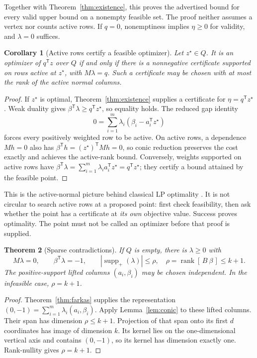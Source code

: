 \documentclass[11pt,letterpaper]{article}
\newcommand{\T}{\mathsf T}
\DeclareMathOperator{\rank}{rank}
\DeclareMathOperator{\supp}{supp}
\newtheorem{theorem}{Theorem}[section]
\newtheorem{corollary}[theorem]{Corollary}
\theoremstyle{definition}
\theoremstyle{remark}
\numberwithin{equation}{section}
\begin{document}
Together with Theorem~\ref{thm:existence}, this proves the advertised bound
for every valid upper bound on a nonempty feasible set. The proof neither
assumes a vertex nor counts active rows. If \(q=0\), nonemptiness implies
\(\eta\ge0\) for validity, and \(\lambda=0\) suffices.

\begin{corollary}[Active rows certify a feasible optimizer]\label{cor:active}
Let \(z^\star\in Q\). It is an optimizer of \(q^\T z\) over \(Q\) if and
only if there is a nonnegative certificate supported on rows active at
\(z^\star\), with \(M\lambda=q\).
Such a certificate may be chosen with at most the rank of the active
normal columns.
\end{corollary}
\begin{proof}
If \(z^\star\) is optimal, Theorem~\ref{thm:existence} supplies a certificate
for \(\eta=q^\T z^\star\). Weak duality gives
\(\beta^\T\lambda\ge q^\T z^\star\), so equality holds.
The reduced gap identity
\[
 0=\sum_{i=1}^m\lambda_i(\beta_i-a_i^\T z^\star)
\]
forces every positively weighted row to be active.
On active rows, a dependence \(Mh=0\) also has
\(\beta^\T h=(z^\star)^\T Mh=0\), so conic reduction preserves the cost
exactly and achieves the active-rank bound.
Conversely, weights supported on active rows have
\(\beta^\T\lambda=\sum_{i=1}^m\lambda_i a_i^\T z^\star=q^\T z^\star\);
they certify a bound attained by the feasible point.
\end{proof}

This is the active-normal picture behind classical LP optimality
\cite[pp.~8--9]{bertsekas10}. It is not circular to search active rows at
a proposed point: first check feasibility, then ask whether the point has
a certificate at \emph{its own} objective value. Success proves optimality.
The point must not be called an optimizer before that proof is supplied.

\begin{theorem}[Sparse contradictions]\label{thm:sparse-contradiction}
If \(Q\) is empty, there is \(\lambda\ge0\) with
\[
 M\lambda=0,\qquad \beta^\T\lambda=-1,\qquad
 |\supp_+(\lambda)|\le \rho,
 \quad \rho=\rank[\,B\ \beta\,]\le k+1.
\]
The positive-support \emph{lifted} columns \((a_i,\beta_i)\) may be chosen
independent. In the infeasible case, \(\rho=k+1\).
\end{theorem}
\begin{proof}
Theorem~\ref{thm:farkas} supplies the representation
\((0,-1)=\sum_{i=1}^m\lambda_i(a_i,\beta_i)\).
Apply Lemma~\ref{lem:conic} to these lifted columns. Their span has dimension
\(\rho\le k+1\). Projection of that span onto its first \(d\) coordinates
has image of dimension \(k\). Its kernel lies on the one-dimensional vertical
axis and contains \((0,-1)\), so its kernel has dimension exactly one.
Rank-nullity gives \(\rho=k+1\).
\end{proof}
\end{document}
